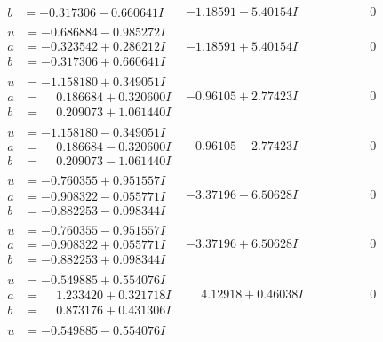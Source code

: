 \documentclass[1p]{elsarticle_modified}
\theoremstyle{definition}
\begin{document}
$$\begin{array}{c|c|c}
\begin{aligned}
b &= -0.317306 - 0.660641 I\end{aligned}
 & -1.18591 - 5.40154 I & \phantom{-0.000000 } 0 \\ \hline\begin{aligned}
u &= -0.686884 - 0.985272 I \\
a &= -0.323542 + 0.286212 I \\
b &= -0.317306 + 0.660641 I\end{aligned}
 & -1.18591 + 5.40154 I & \phantom{-0.000000 } 0 \\ \hline\begin{aligned}
u &= -1.158180 + 0.349051 I \\
a &= \phantom{-}0.186684 + 0.320600 I \\
b &= \phantom{-}0.209073 + 1.061440 I\end{aligned}
 & -0.96105 + 2.77423 I & \phantom{-0.000000 } 0 \\ \hline\begin{aligned}
u &= -1.158180 - 0.349051 I \\
a &= \phantom{-}0.186684 - 0.320600 I \\
b &= \phantom{-}0.209073 - 1.061440 I\end{aligned}
 & -0.96105 - 2.77423 I & \phantom{-0.000000 } 0 \\ \hline\begin{aligned}
u &= -0.760355 + 0.951557 I \\
a &= -0.908322 - 0.055771 I \\
b &= -0.882253 - 0.098344 I\end{aligned}
 & -3.37196 - 6.50628 I & \phantom{-0.000000 } 0 \\ \hline\begin{aligned}
u &= -0.760355 - 0.951557 I \\
a &= -0.908322 + 0.055771 I \\
b &= -0.882253 + 0.098344 I\end{aligned}
 & -3.37196 + 6.50628 I & \phantom{-0.000000 } 0 \\ \hline\begin{aligned}
u &= -0.549885 + 0.554076 I \\
a &= \phantom{-}1.233420 + 0.321718 I \\
b &= \phantom{-}0.873176 + 0.431306 I\end{aligned}
 & \phantom{-}4.12918 + 0.46038 I & \phantom{-0.000000 } 0 \\ \hline\begin{aligned}
u &= -0.549885 - 0.554076 I \\

\end{aligned}
\end{array}$$
\end{document}
